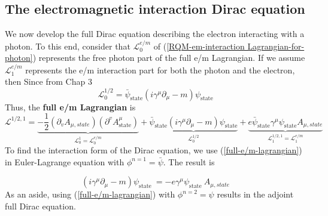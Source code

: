 \subsection{The electromagnetic interaction Dirac equation}
We now develop the full Dirac equation describing the electron interacting with a photon. To this end, consider that $\mathcal{L}_{0}^{e / m}$ of (\ref{RQM-em-interaction Lagrangian-for-photon}) represents the free photon part of the full e/m Lagrangian. If we assume $\mathcal{L}_{1}^{e / m}$ represents the e/m interaction part for both the photon and the electron, then \textbf{} Since from Chap 3
$$
\mathcal{L}_{0}^{1 / 2}=\bar{\psi}_{\text {state}}\left(i \gamma^{\mu} \partial_{\mu}-m\right) \psi_{\text {state}}
$$
Thus, the \textbf{full e/m Lagrangian} is
\begin{equation}
\mathcal{L}^{1 / 2,1}=\underbrace{-\frac{1}{2}\left(\partial_{v} A_{\mu,state}\right)\left(\partial^{v} A_{\text {state}}^{\mu}\right)}_{\mathcal{L}_{0}^{1}=\mathcal{L}_{0}^{e / m}}+\underbrace{\bar{\psi}_{\text {state}}\left(i \gamma^{\mu} \partial_{\mu}-m\right) \psi_{\text {state}}}_{\mathcal{L}_{0}^{1 / 2}}+\underbrace{e \bar{\psi}_{\text {state}} \gamma^{\mu} \psi_{\text {state}} A_{\mu,state}}_{\mathcal{L}_{1}^{1 / 2,1}=\mathcal{L}_{1}^{e/m}}
\label{full-e/m-lagrangian}
\end{equation}
To find the interaction form of the Dirac equation, we use (\ref{full-e/m-lagrangian}) in Euler-Lagrange equation with $\phi^{n=1}=\bar{\psi}$. The result is
\begin{qt}
\begin{equation}
\left(i \gamma^{\mu} \partial_{\mu}-m\right) \psi_{\text {state }}=-e \gamma^{\mu} \psi_{\text {state }} A_{\mu,state}
\label{full-Dirac-eqn}
\end{equation}
As an aside, using (\ref{full-e/m-lagrangian}) with $\phi^{n=2}=\psi$ results in the adjoint full Dirac equation.
\end{qt}

